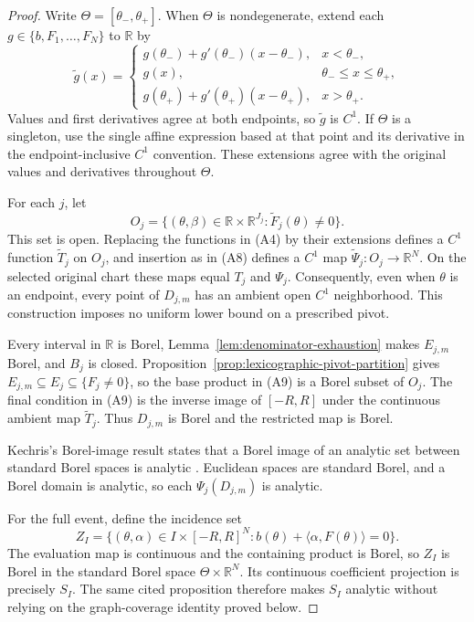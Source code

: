 \begin{proof}
Write $\Theta=[\theta_-,\theta_+]$.  When $\Theta$ is nondegenerate, extend
each $g\in\{b,F_1,\ldots,F_N\}$ to $\mathbb R$ by
\[
\widetilde g(x)=
\begin{cases}
g(\theta_-)+g'(\theta_-)(x-\theta_-),&x<\theta_-,\\
g(x),&\theta_-\leq x\leq\theta_+,\\
g(\theta_+)+g'(\theta_+)(x-\theta_+),&x>\theta_+.
\end{cases}
\tag{A11}
\]
Values and first derivatives agree at both endpoints, so $\widetilde g$ is
$C^1$.  If $\Theta$ is a singleton, use the single affine expression based
at that point and its derivative in the endpoint-inclusive $C^1$
convention.  These extensions agree with the original values and
derivatives throughout $\Theta$.

For each $j$, let
\[
O_j=\{(\theta,\beta)\in
 \mathbb R\times\mathbb R^{J_j}:\widetilde F_j(\theta)\neq0\}.
\tag{A12}
\]
This set is open.  Replacing the functions in \textup{(A4)} by their
extensions defines a $C^1$ function $\widetilde T_j$ on $O_j$, and insertion
as in \textup{(A8)} defines a $C^1$ map
$\widetilde\Psi_j:O_j\to\mathbb R^N$.  On the selected original chart these
maps equal $T_j$ and $\Psi_j$.  Consequently, even when $\theta$ is an
endpoint, every point of $D_{j,m}$ has an ambient open $C^1$ neighborhood.
This construction imposes no uniform lower bound on a prescribed pivot.

Every interval in $\mathbb R$ is Borel,
Lemma~\ref{lem:denominator-exhaustion} makes $E_{j,m}$ Borel, and $B_j$ is
closed.  Proposition~\ref{prop:lexicographic-pivot-partition} gives
$E_{j,m}\subseteq E_j\subseteq\{F_j\neq0\}$, so the base product in
\textup{(A9)} is a Borel subset of $O_j$.  The final condition in
\textup{(A9)} is the inverse image of $[-R,R]$ under the continuous ambient
map $\widetilde T_j$.  Thus $D_{j,m}$ is Borel and the restricted map is
Borel.

Kechris's Borel-image result states that a Borel image of an analytic set
between standard Borel spaces is analytic
\citep[Section~14, Proposition~14.4, p.~86]{Kechris1995}.  Euclidean spaces
are standard Borel, and a Borel domain is analytic, so each
$\Psi_j(D_{j,m})$ is analytic.

For the full event, define the incidence set
\[
Z_I=\{(\theta,\alpha)\in I\times[-R,R]^N:
 b(\theta)+\langle\alpha,F(\theta)\rangle=0\}.
\tag{A13}
\]
The evaluation map is continuous and the containing product is Borel, so
$Z_I$ is Borel in the standard Borel space
$\Theta\times\mathbb R^N$.  Its continuous coefficient projection is
precisely $S_I$.  The same cited proposition therefore makes $S_I$
analytic without relying on the graph-coverage identity proved below.


\end{proof}
